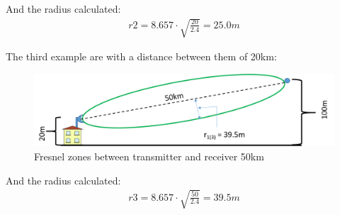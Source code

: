 And the radius calculated:
\begin{align*}
r2 = 8.657\cdot \sqrt{\frac{20}{2.4}} = 25.0m
\end{align*}

The third example are with a distance between them of 20km:

\begin{figure}[h]
	\centering
	\includegraphics[scale=0.50]{figures/fresnel_50km.png}
	\caption{Fresnel zones between transmitter and receiver 50km}
	\label{fig:fresnel_zones_50km}
\end{figure}  

And the radius calculated:
\begin{align*}
r3 = 8.657\cdot \sqrt{\frac{50}{2.4}} = 39.5m
\end{align*}

\newpage